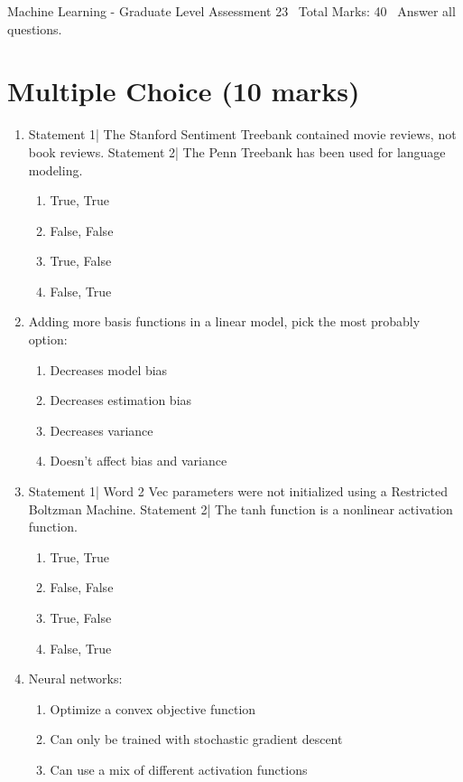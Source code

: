 \documentclass[12pt]{article}
\begin{document}
\begin{center}
Machine Learning - Graduate Level Assessment 23 \
Total Marks: 40 \
Answer all questions.
\end{center}

\section*{Multiple Choice (10 marks)}
\begin{enumerate}[label=\arabic*.]
\item Statement 1| The Stanford Sentiment Treebank contained movie reviews, not book reviews. Statement 2| The Penn Treebank has been used for language modeling.
\begin{enumerate}[label=(\alph*)]
    \item True, True
    \item False, False
    \item True, False
    \item False, True
\end{enumerate}
\item Adding more basis functions in a linear model, pick the most probably option:
\begin{enumerate}[label=(\alph*)]
    \item Decreases model bias
    \item Decreases estimation bias
    \item Decreases variance
    \item Doesn't affect bias and variance
\end{enumerate}
\item Statement 1| Word 2 Vec parameters were not initialized using a Restricted Boltzman Machine. Statement 2| The tanh function is a nonlinear activation function.
\begin{enumerate}[label=(\alph*)]
    \item True, True
    \item False, False
    \item True, False
    \item False, True
\end{enumerate}
\item Neural networks:
\begin{enumerate}[label=(\alph*)]
    \item Optimize a convex objective function
    \item Can only be trained with stochastic gradient descent
    \item Can use a mix of different activation functions

\end{enumerate}
\end{enumerate}
\end{document}
